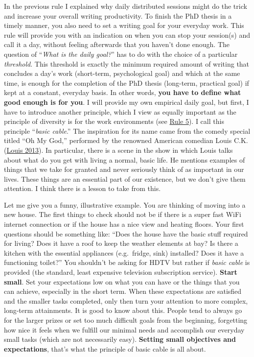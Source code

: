 \documentclass[
  12pt,
]{book}
\begin{document}
In the previous rule I explained why daily distributed sessions might do the trick and increase your overall writing productivity.
To finish the PhD thesis in a timely manner, you also need to set a writing goal for your everyday work.
This rule will provide you with an indication on when you can stop your session(s) and call it a day, without feeling afterwards that you haven't done enough.
The question of ``\emph{What is the daily goal?}'' has to do with the choice of a particular \emph{threshold}.
This threshold is exactly the minimum required amount of writing that concludes a day's work (short-term, psychological goal) and which at the same time, is enough for the completion of the PhD thesis (long-term, practical goal) if kept at a constant, everyday basis.
In other words, \textbf{you have to define what good enough is for you}.
I will provide my own empirical daily goal, but first, I have to introduce another principle, which I view as equally important as the principle of diversity is for the work environments (see \protect\hyperlink{rule5}{Rule 5}).
I call this principle ``\emph{basic cable}.''
The inspiration for its name came from the comedy special titled ``Oh My God,'' performed by the renowned American comedian Louis C.K. (\protect\hyperlink{ref-BasicCable-LCK}{Louis 2013}).
In particular, there is a scene in the show in which Louis talks about what do you get with living a normal, basic life.
He mentions examples of things that we take for granted and never seriously think of as important in our lives.
These things are an essential part of our existence, but we don't give them attention.
I think there is a lesson to take from this.

Let me give you a funny, illustrative example.
You are thinking of moving into a new house.
The first things to check should not be if there is a super fast WiFi internet connection or if the house has a nice view and heating floors.
Your first questions should be something like: ``Does the house have the basic stuff required for living?
Does it have a roof to keep the weather elements at bay?
Is there a kitchen with the essential appliances (e.g.~fridge, sink) installed?
Does it have a functioning toilet?''
You shouldn't be asking for HDTV but rather if \emph{basic cable} is provided (the standard, least expensive television subscription service).
\textbf{Start small}.
Set your expectations low on what you can have or the things that you can achieve, especially in the short term.
When these expectations are satisfied and the smaller tasks completed, only then turn your attention to more complex, long-term attainments.
It is good to know about this.
People tend to always go for the larger prizes or set too much difficult goals from the beginning, forgetting how nice it feels when we fulfill our minimal needs and accomplish our everyday small tasks (which are not necessarily easy).
\textbf{Setting small objectives and expectations}, that's what the principle of basic cable is all about.
\end{document}
